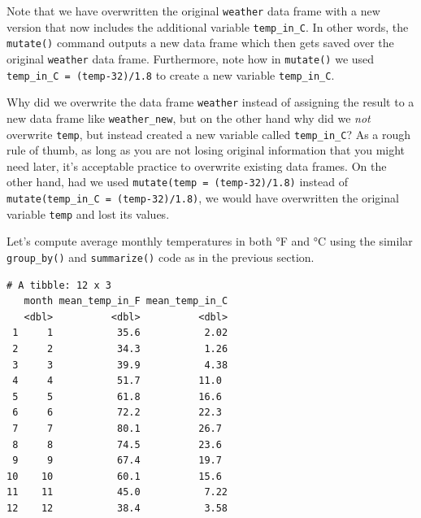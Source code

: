 \documentclass[12pt, krantz2,]{krantz}
\makeatletter
\newenvironment{Shaded}{\begin{snugshade}}{\end{snugshade}}
\newcommand{\DataTypeTok}[1]{\textcolor[rgb]{0.27,0.27,0.27}{#1}}
\newcommand{\KeywordTok}[1]{\textcolor[rgb]{0.27,0.27,0.27}{\textbf{#1}}}
\newcommand{\NormalTok}[1]{#1}
\newcommand{\OperatorTok}[1]{\textcolor[rgb]{0.43,0.43,0.43}{\textbf{#1}}}
\newcommand{\OtherTok}[1]{\textcolor[rgb]{0.37,0.37,0.37}{#1}}
\newcommand{\StringTok}[1]{\textcolor[rgb]{0.5,0.5,0.5}{#1}}
\newenvironment{kframe}{%
\medskip{}
\setlength{\fboxsep}{.8em}
 \def\at@end@of@kframe{}%
 \ifinner\ifhmode%
  \def\at@end@of@kframe{\end{minipage}}%
  \begin{minipage}{\columnwidth}%
 \fi\fi%
 \def\FrameCommand##1{\hskip\@totalleftmargin \hskip-\fboxsep
 \colorbox{shadecolor}{##1}\hskip-\fboxsep
     \hskip-\linewidth \hskip-\@totalleftmargin \hskip\columnwidth}%
 \MakeFramed {\advance\hsize-\width
   \@totalleftmargin\z@ \linewidth\hsize
   \@setminipage}}%
 {\par\unskip\endMakeFramed%
 \at@end@of@kframe}
\renewenvironment{Shaded}{\begin{kframe}}{\end{kframe}}
\makeatother
\begin{document}
Note that we have overwritten the original \texttt{weather} data frame with a new version that now includes the additional variable \texttt{temp\_in\_C}. In other words, the \texttt{mutate()} command outputs a new data frame which then gets saved over the original \texttt{weather} data frame. Furthermore, note how in \texttt{mutate()} we used \texttt{temp\_in\_C\ =\ (temp-32)/1.8} to create a new variable \texttt{temp\_in\_C}.

Why did we overwrite the data frame \texttt{weather} instead of assigning the result to a new data frame like \texttt{weather\_new}, but on the other hand why did we \emph{not} overwrite \texttt{temp}, but instead created a new variable called \texttt{temp\_in\_C}? As a rough rule of thumb, as long as you are not losing original information that you might need later, it's acceptable practice to overwrite existing data frames. On the other hand, had we used \texttt{mutate(temp\ =\ (temp-32)/1.8)} instead of \texttt{mutate(temp\_in\_C\ =\ (temp-32)/1.8)}, we would have overwritten the original variable \texttt{temp} and lost its values.

Let's compute average monthly temperatures in both °F and °C using the similar \texttt{group\_by()} and \texttt{summarize()} code as in the previous section.

\begin{Shaded}
\end{Shaded}

\begin{verbatim}
# A tibble: 12 x 3
   month mean_temp_in_F mean_temp_in_C
   <dbl>          <dbl>          <dbl>
 1     1           35.6           2.02
 2     2           34.3           1.26
 3     3           39.9           4.38
 4     4           51.7          11.0 
 5     5           61.8          16.6 
 6     6           72.2          22.3 
 7     7           80.1          26.7 
 8     8           74.5          23.6 
 9     9           67.4          19.7 
10    10           60.1          15.6 
11    11           45.0           7.22
12    12           38.4           3.58
\end{verbatim}
\end{document}
